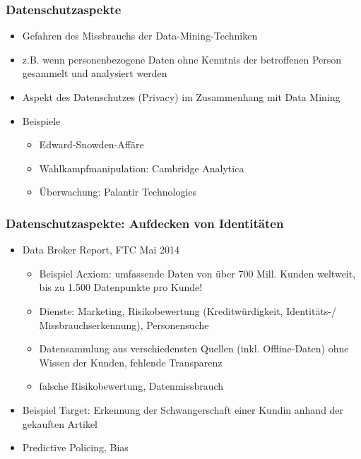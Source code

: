\begin{frame}
\frametitle{Datenschutzaspekte}

\begin{itemize}
\item Gefahren des Missbrauchs der Data-Mining-Techniken
\item z.B. wenn personenbezogene Daten ohne Kenntnis der
  betroffenen Person gesammelt und analysiert werden
\item Aspekt des Datenschutzes (Privacy) im Zusammenhang mit Data Mining
\item Beispiele
\begin{itemize}
\item Edward-Snowden-Affäre
\item Wahlkampfmanipulation: Cambridge Analytica
\item Überwachung: Palantir Technologies
\end{itemize}
\end{itemize}

\end{frame}


\begin{frame}
\frametitle{Datenschutzaspekte:  Aufdecken von Identitäten}

\begin{itemize}
\item Data Broker Report, FTC Mai 2014
\begin{itemize}
\item Beispiel Acxiom: umfassende Daten von über 700 Mill. Kunden weltweit,
bis zu 1.500 Datenpunkte pro Kunde!
\item Dienste: Marketing, Risikobewertung (Kreditwürdigkeit, Identitäts-/ Missbrauchserkennung), Personensuche
\item Datensammlung aus verschiedensten Quellen (inkl. Offline-Daten) ohne Wissen der Kunden, fehlende Transparenz
\item falsche Risikobewertung, Datenmissbrauch
\end{itemize}
\item Beispiel Target: Erkennung der Schwangerschaft einer Kundin anhand der gekauften Artikel
\item Predictive Policing, Bias
\end{itemize}
\end{frame}


